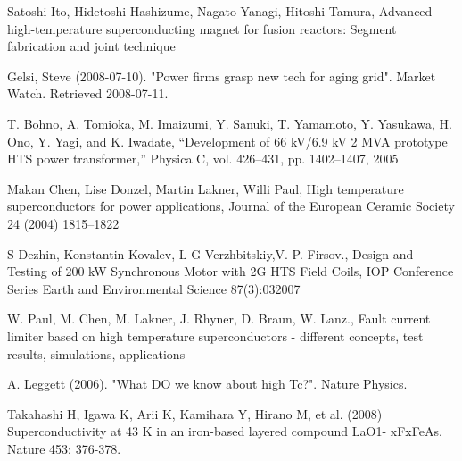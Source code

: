 \documentclass{article}
\begin{document}
\begin{thebibliography}{1}
		\newblock Satoshi Ito, Hidetoshi Hashizume, Nagato Yanagi, Hitoshi Tamura, Advanced high-temperature superconducting magnet for fusion reactors: Segment fabrication and joint technique
		
		\newblock Gelsi, Steve (2008-07-10). "Power firms grasp new tech for aging grid". Market Watch. Retrieved 2008-07-11.
		
		\newblock T. Bohno, A. Tomioka, M. Imaizumi, Y. Sanuki, T. Yamamoto, Y. Yasukawa, H. Ono, Y. Yagi, and K. Iwadate, “Development of 66 kV/6.9 kV 2 MVA prototype HTS power transformer,” Physica C, vol. 426–431, pp. 1402–1407, 2005
		
		\newblock Makan Chen, Lise Donzel, Martin Lakner, Willi Paul, High temperature superconductors for power applications, Journal of the European Ceramic Society 24 (2004) 1815–1822
		
		\newblock S Dezhin, Konstantin Kovalev, L G Verzhbitskiy,V. P. Firsov.,  Design and Testing of 200 kW Synchronous Motor with 2G HTS Field Coils, IOP Conference Series Earth and Environmental Science 87(3):032007
		
		\newblock W. Paul, M. Chen, M. Lakner, J. Rhyner, D. Braun, W. Lanz., Fault current limiter based on high temperature    superconductors - different concepts, test results, simulations, applications
		
		\newblock A. Leggett (2006). "What DO we know about high Tc?". Nature Physics.
		
		\newblock Takahashi H, Igawa K, Arii K, Kamihara Y, Hirano M, et al. (2008) Superconductivity at 43 K in an iron-based layered compound LaO1-
		xFxFeAs. Nature 453: 376-378.
	\end{thebibliography}
	
	
\end{document}
